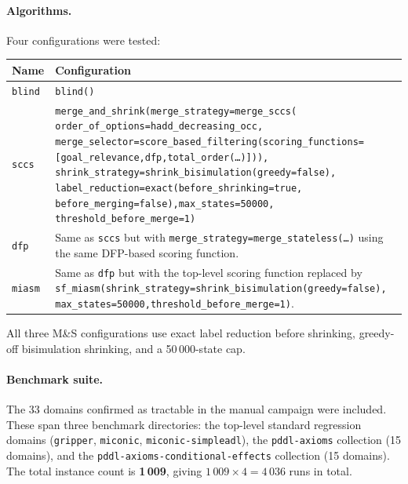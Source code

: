 \documentclass[11pt,a4paper]{article}
\begin{document}
\paragraph{Algorithms.}
Four configurations were tested:

\begin{center}
\small
\begin{tabular}{lp{10.5cm}}
\toprule
\textbf{Name} & \textbf{Configuration} \\
\midrule
\texttt{blind}  &
  \texttt{blind()} \\[6pt]
\texttt{sccs}   &
  \texttt{merge\_and\_shrink(merge\_strategy=merge\_sccs(}
  \texttt{order\_of\_options=hadd\_decreasing\_occ,}
  \texttt{merge\_selector=score\_based\_filtering(scoring\_functions=}
  \texttt{[goal\_relevance,dfp,total\_order(\ldots)])),}
  \texttt{shrink\_strategy=shrink\_bisimulation(greedy=false),}
  \texttt{label\_reduction=exact(before\_shrinking=true,}
  \texttt{before\_merging=false),max\_states=50000,}
  \texttt{threshold\_before\_merge=1)} \\[6pt]
\texttt{dfp}    &
  Same as \texttt{sccs} but with
  \texttt{merge\_strategy=merge\_stateless(\ldots)} using the same
  DFP-based scoring function. \\[6pt]
\texttt{miasm}  &
  Same as \texttt{dfp} but with the top-level scoring function replaced
  by \texttt{sf\_miasm(shrink\_strategy=shrink\_bisimulation(greedy=false),}
  \texttt{max\_states=50000,threshold\_before\_merge=1)}. \\
\bottomrule
\end{tabular}
\end{center}

All three M\&S configurations use exact label reduction before shrinking,
greedy-off bisimulation shrinking, and a 50\,000-state cap.

\paragraph{Benchmark suite.}
The 33 domains confirmed as tractable in the manual campaign were included.
These span three benchmark directories:
the top-level standard regression domains
(\texttt{gripper}, \texttt{miconic}, \texttt{miconic-simpleadl}),
the \texttt{pddl-axioms} collection (15 domains), and the
\texttt{pddl-axioms-conditional-effects} collection (15 domains).
The total instance count is \textbf{1\,009}, giving $1\,009 \times 4 = 4\,036$
runs in total.
\end{document}
